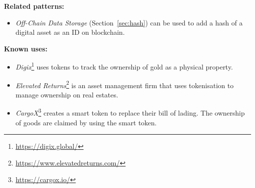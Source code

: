 
\vspace{0.5em}\noindent \textbf{Related patterns:} 
\begin{itemize}
    \item \textit{Off-Chain Data Storage} (Section~\ref{sec:hash}) can be used to add a hash of a digital asset as an ID on blockchain.
\end{itemize}


\vspace{0.5em}\noindent \textbf{Known uses:}
\begin{itemize}
  \item \textit{Digix}\footnote{\url{https://digix.global/}} uses tokens to track the ownership of gold as a physical property.
  \item \textit{Elevated Returns}\footnote{\url{https://www.elevatedreturns.com/}} is an asset management firm that uses tokenisation to manage ownership on real estates. %
  \item \textit{CargoX}\footnote{\url{https://cargox.io/}} creates a smart token to replace their bill of lading. The ownership of goods are claimed by using the smart token.
\end{itemize}




